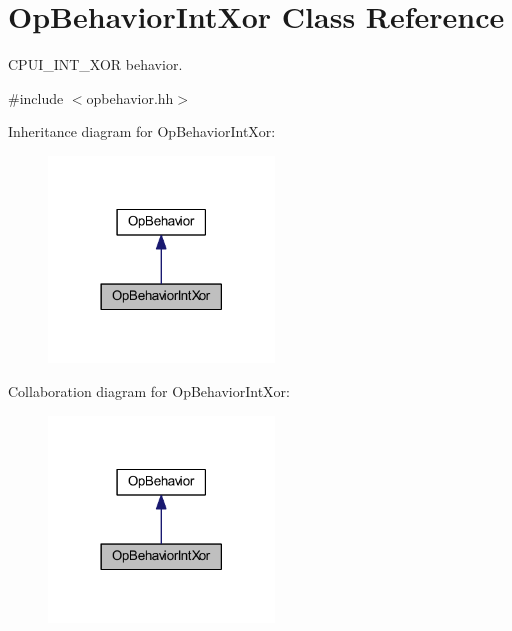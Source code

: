 \hypertarget{class_op_behavior_int_xor}{}\section{Op\+Behavior\+Int\+Xor Class Reference}
\label{class_op_behavior_int_xor}


C\+P\+U\+I\+\_\+\+I\+N\+T\+\_\+\+X\+OR behavior.  




{\ttfamily \#include $<$opbehavior.\+hh$>$}



Inheritance diagram for Op\+Behavior\+Int\+Xor\+:
\nopagebreak
\begin{figure}[H]
\begin{center}
\leavevmode
\includegraphics[width=170pt]{class_op_behavior_int_xor__inherit__graph}
\end{center}
\end{figure}


Collaboration diagram for Op\+Behavior\+Int\+Xor\+:
\nopagebreak
\begin{figure}[H]
\begin{center}
\leavevmode
\includegraphics[width=170pt]{class_op_behavior_int_xor__coll__graph}
\end{center}
\end{figure}
